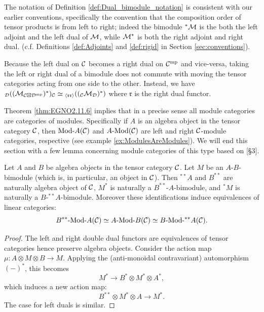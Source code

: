 \documentclass{amsart}
\begin{document}
\begin{remark}
	The notation of Definition \ref{def:Dual_bimodule_notation} is consistent with our earlier conventions, specifically the convention that the composition order of tensor products is from left to right; indeed the bimodule ${}^*\mathcal M$ is the both the left adjoint and the left dual of $\mathcal M$, while $\mathcal M^*$ is both the right adjoint and right dual. (c.f. Definitions \ref{def:Adjoints} and \ref{def:rigid} in Section \ref{sec:conventions}). 
\end{remark}

\begin{warning}
Because the left dual on $\mathcal C$ becomes a right dual on $\mathcal C^{\mathrm{mp}}$ and vice-versa, taking the left or right dual of a bimodule does not commute with moving the tensor categories acting from one side to the other.  Instead, we have ${}_\mathcal D ((\mathcal M_{\mathcal C \boxtimes \mathcal D^{\mathrm{mp}}})^*)_\mathcal C \simeq {}_{\langle \mathfrak{r r} \rangle}(({}_\mathcal C \mathcal M_\mathcal D)^*)$ where $\mathfrak{r}$ is the right dual functor. 
\end{warning}

Theorem \ref{thm:EGNO2.11.6} implies that in a precise sense all module categories are categories of modules. Specifically if $A$ is an algebra object in the tensor category $\mathcal C$, then $\Mod{}{A}(\cC)$ and $\Mod{A}{}(\cC)$ are left and right $\mathcal C$-module categories, respective (see example \ref{ex:ModulesAreModules}). We will end this section with a few lemma concerning module categories of this type based on \cite{0404504}[\S 3].

\begin{lemma}
	Let $A$ and $B$ be algebra objects in the tensor category $\mathcal C$. Let $M$ be an $A$-$B$-bimodule (which is, in particular, an object in $\mathcal C$). Then ${}^{**}A$ and $B^{**}$ are naturally algebra object of $\mathcal C$, $M^*$ is naturally a $B^{**}$-$A$-bimodule, and ${}^*M$ is naturally a $B$-${}^{**}A$-bimodule. Moreover these identifications induce equivalences of linear categories:
	\begin{equation*}
		\Mod{B^{**}}{A}(\cC) \simeq \Mod{A}{B}(\cC) \simeq \Mod{B}{{}^{**}A}(\cC).
	\end{equation*}
\end{lemma}

\begin{proof}
	The left and right double dual functors are equivalences of tensor categories hence preserve algebra objects. Consider the action map $\mu:A \otimes M \otimes B \to M$. Applying the (anti-monoidal contravariant) automorphism $(-)^*$, this becomes
	\begin{equation*}
		M^* \to B^* \otimes M^* \otimes A^*,
	\end{equation*}
	which induces a new action map:
	\begin{equation*}
		B^{**} \otimes M^* \otimes A \to M^*.
	\end{equation*}
	The case for left duals is similar. 
\end{proof}
\end{document}
